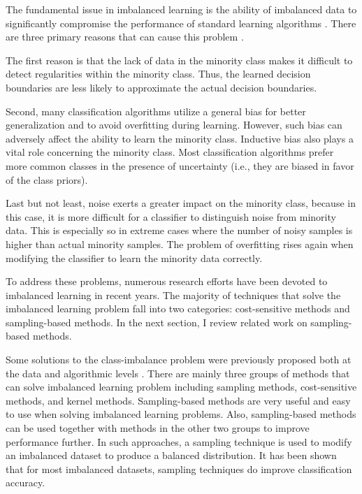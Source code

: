 \documentclass{iitthesis}
\begin{document}
The fundamental issue in imbalanced learning is the ability of imbalanced data to significantly compromise the performance of standard learning algorithms \cite{HH:09}. There are three primary reasons that can cause this problem \cite{weiss2004mining}. 

The first reason is that the lack of data in the minority class makes it difficult to detect regularities within the minority class. Thus, the learned decision boundaries are less likely to approximate the actual decision boundaries. 

Second, many classification algorithms utilize a general bias for better generalization and to avoid overfitting during learning. However, such bias can adversely affect the ability to learn the minority class. Inductive bias also plays a vital role concerning the minority class. Most classification algorithms prefer more common classes in the presence of uncertainty (i.e., they are biased in favor of the class priors). 

Last but not least, noise exerts a greater impact on the minority class, because in this case, it is more difficult for a classifier to distinguish noise from minority data. This is especially so in extreme cases where the number of noisy samples is higher than actual minority samples. The problem of overfitting rises again when modifying the classifier to learn the minority data correctly.

To address these problems, numerous research efforts have been devoted to imbalanced learning in recent years. The majority of techniques that solve the imbalanced learning problem fall into two categories: cost-sensitive methods and sampling-based methods. In the next section, I review related work on sampling-based methods.

Some solutions to the class-imbalance problem were previously proposed both at the data and algorithmic levels \cite{chawla2004editorial}. There are mainly three groups of methods that can solve imbalanced learning problem \cite{HH:09} including sampling methods, cost-sensitive methods, and kernel methods. Sampling-based methods are very useful and easy to use when solving imbalanced learning problems. Also, sampling-based methods can be used together with methods in the other two groups to improve performance further. In such approaches, a sampling technique is used to modify an imbalanced dataset to produce a balanced distribution. It has been shown that for most imbalanced datasets, sampling techniques do improve classification accuracy.
\end{document}
